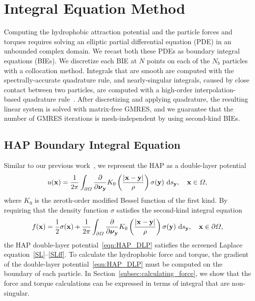 \documentclass[lineno]{jfm}
\newcommand{\bd}{\partial}
\newcommand{\nnu}{\boldsymbol{\nu}}
\newcommand{\xx}{\mathbf{x}}
\newcommand{\yy}{\mathbf{y}}
\newcommand{\pderiv}[2]{\frac{\partial #1}{\partial #2}}
\begin{document}
\section{Integral Equation Method}
\label{sec:IEM}
Computing the hydrophobic attraction potential and the particle forces
and torques requires solving an elliptic partial differential equation
(PDE) in an unbounded complex domain. We recast both these PDEs as
boundary integral equations (BIEs). We discretize each BIE at $N$ points
on each of the $N_b$ particles with a collocation method. Integrals that
are smooth are computed with the spectrally-accurate quadrature rule,
and nearly-singular integrals, caused by close contact between two
particles, are computed with a high-order interpolation-based quadrature
rule~\cite{qua-bir2014}. After discretizing and applying quadrature, the
resulting linear system is solved with matrix-free GMRES, and we
guarantee that the number of GMRES iterations is mesh-independent by
using second-kind BIEs.


\subsection{HAP Boundary Integral Equation}
Similar to our previous work~\cite{Fu20}, we represent the HAP as a
double-layer potential
\begin{align}
  \label{eqn:HAP_DLP}
  u(\xx) = \frac{1}{2\pi} \int_{\bd\Omega} \pderiv{}{\nnu_\yy}
    K_0 \left(\frac{|\xx - \yy|}{\rho}\right) \sigma(\yy) \, \dif s_\yy,
    \quad \xx \in \Omega,
\end{align}
where $K_0$ is the zeroth-order modified Bessel function of the first
kind. By requiring that the density function $\sigma$ satisfies the
second-kind integral equation
\begin{align}
  f(\xx) = \frac{1}{2}\sigma(\xx) + 
    \frac{1}{2\pi}\int_{\bd\Omega} \pderiv{}{\nnu_\yy}
    K_0 \left(\frac{|\xx - \yy|}{\rho}\right) \sigma(\yy) \, \dif s_\yy,
    \quad \xx \in \bd\Omega,
\end{align}
the HAP double-layer potential~\eqref{eqn:HAP_DLP} satisfies the
screened Laplace equation~\eqref{SL}--\eqref{SLff}. To calculate the
hydrophobic force and torque, the gradient of the double-layer
potential~\eqref{eqn:HAP_DLP} must be computed on the boundary of each
particle. In Section~\ref{subsec:calculating_force}, we show that the force and
torque calculations can be expressed in terms of integral that are
non-singular.
\end{document}
